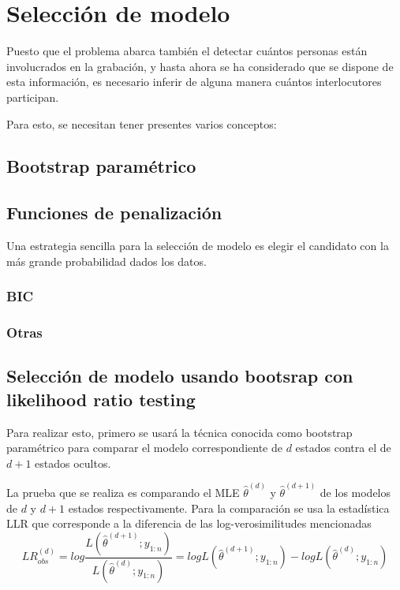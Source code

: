 
\chapter{Selección de modelo}


Puesto que el problema abarca también el detectar cuántos personas están involucrados en la grabación, y hasta ahora se ha considerado que se dispone de esta información, es necesario inferir de alguna manera cuántos interlocutores participan.

Para esto, se necesitan tener presentes varios conceptos: 

\section{Bootstrap paramétrico}

\section{Funciones de penalización}

Una estrategia sencilla para la selección de modelo es elegir el candidato con la más grande probabilidad dados los datos. 

\subsection{BIC}

\subsection{Otras}



\section{Selección de modelo usando bootsrap con likelihood ratio testing}

Para realizar esto, primero se usará la técnica conocida como bootstrap paramétrico para comparar el modelo correspondiente de $d$ estados contra el de $d+1$ estados ocultos.

La prueba que se realiza es comparando el \ac{MLE} $\hat \theta^{(d)}$ y $\hat \theta^{(d+1)}$ de los modelos de $d$ y $d+1$ estados respectivamente. Para la comparación se usa la estadística \ac{LLR} que corresponde a la diferencia de las log-verosimilitudes mencionadas
\begin{equation}
  LR^{(d)}_{obs} = log \frac{L(\hat \theta^{(d+1)}; y_{1:n})}{L(\hat \theta^{(d)}; y_{1:n})} =
    log L(\hat \theta^{(d+1)}; y_{1:n}) - 
    log L(\hat \theta^{(d)}; y_{1:n})
\end{equation}

